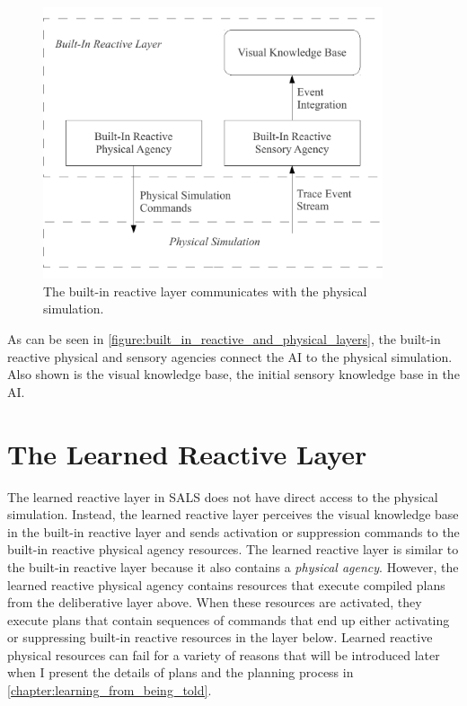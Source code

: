 \begin{figure}
\centering
\includegraphics[width=10cm]{gfx/built_in_reactive_and_physical_layers}
\caption{The built-in reactive layer communicates with the physical
  simulation.}
\label{figure:built_in_reactive_and_physical_layers}
\end{figure}
As can be seen in
{\mbox{\autoref{figure:built_in_reactive_and_physical_layers}}}, the
built-in reactive physical and sensory agencies connect the AI to the
physical simulation.  Also shown is the visual knowledge base, the
initial sensory knowledge base in the AI.

\section{The Learned Reactive Layer}

The learned reactive layer in SALS does not have direct access to the
physical simulation.  Instead, the learned reactive layer perceives
the visual knowledge base in the built-in reactive layer and sends
activation or suppression commands to the built-in reactive physical
agency resources.  The learned reactive layer is similar to the
built-in reactive layer because it also contains a {\emph{physical
    agency}}.  However, the learned reactive physical agency contains
resources that execute compiled plans from the deliberative layer
above.  When these resources are activated, they execute plans that
contain sequences of commands that end up either activating or
suppressing built-in reactive resources in the layer below.  Learned
reactive physical resources can fail for a variety of reasons that
will be introduced later when I present the details of plans and the
planning process in
{\mbox{\autoref{chapter:learning_from_being_told}}}.

